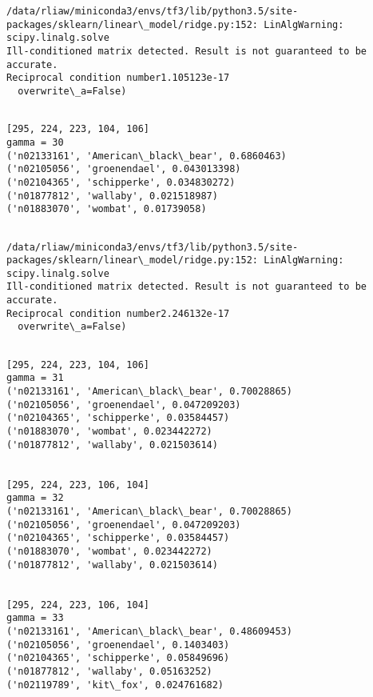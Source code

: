 \documentclass[11pt]{article}
\begin{document}
    \begin{Verbatim}[commandchars=\\\{\}]
/data/rliaw/miniconda3/envs/tf3/lib/python3.5/site-packages/sklearn/linear\_model/ridge.py:152: LinAlgWarning: scipy.linalg.solve
Ill-conditioned matrix detected. Result is not guaranteed to be accurate.
Reciprocal condition number1.105123e-17
  overwrite\_a=False)

    \end{Verbatim}

    \begin{Verbatim}[commandchars=\\\{\}]

[295, 224, 223, 104, 106]
gamma = 30
('n02133161', 'American\_black\_bear', 0.6860463)
('n02105056', 'groenendael', 0.043013398)
('n02104365', 'schipperke', 0.034830272)
('n01877812', 'wallaby', 0.021518987)
('n01883070', 'wombat', 0.01739058)


    \end{Verbatim}

    \begin{Verbatim}[commandchars=\\\{\}]
/data/rliaw/miniconda3/envs/tf3/lib/python3.5/site-packages/sklearn/linear\_model/ridge.py:152: LinAlgWarning: scipy.linalg.solve
Ill-conditioned matrix detected. Result is not guaranteed to be accurate.
Reciprocal condition number2.246132e-17
  overwrite\_a=False)

    \end{Verbatim}

    \begin{Verbatim}[commandchars=\\\{\}]

[295, 224, 223, 104, 106]
gamma = 31
('n02133161', 'American\_black\_bear', 0.70028865)
('n02105056', 'groenendael', 0.047209203)
('n02104365', 'schipperke', 0.03584457)
('n01883070', 'wombat', 0.023442272)
('n01877812', 'wallaby', 0.021503614)


[295, 224, 223, 106, 104]
gamma = 32
('n02133161', 'American\_black\_bear', 0.70028865)
('n02105056', 'groenendael', 0.047209203)
('n02104365', 'schipperke', 0.03584457)
('n01883070', 'wombat', 0.023442272)
('n01877812', 'wallaby', 0.021503614)


[295, 224, 223, 106, 104]
gamma = 33
('n02133161', 'American\_black\_bear', 0.48609453)
('n02105056', 'groenendael', 0.1403403)
('n02104365', 'schipperke', 0.05849696)
('n01877812', 'wallaby', 0.05163252)
('n02119789', 'kit\_fox', 0.024761682)


    \end{Verbatim}
\end{document}
